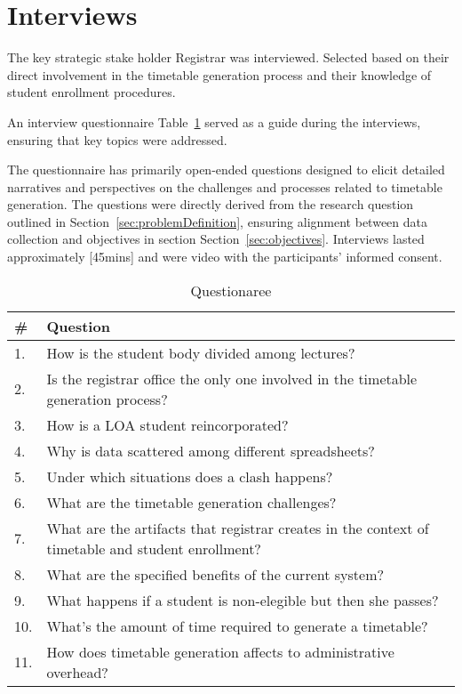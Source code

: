 \section{Interviews}
\label{sec:appendixInterviews}

The key strategic stake holder Registrar was interviewed.
Selected based on their direct involvement in the timetable generation process and their knowledge of student enrollment procedures.

An interview questionnaire Table~\ref{tab:questionaree} served as a guide during the interviews, ensuring that key topics were addressed.

The questionnaire has primarily open-ended questions designed to elicit detailed narratives and perspectives on the challenges and processes related to timetable generation.
The questions were directly derived from the research question outlined in Section~\ref{sec:problemDefinition}, ensuring alignment between data collection and objectives in section Section~\ref{sec:objectives}.
Interviews lasted approximately [45mins] and were video with the participants' informed consent.

\begin{table}[h]
    \caption{Questionaree}\label{tab:questionaree}
    \begin{tabularx}{\textwidth}{lX}
        \toprule
        \textbf{\#} &  \textbf{Question}\\
        \midrule
        1. & How is the student body divided among lectures? \\
        2. & Is the registrar office the only one involved in the timetable generation process?\\
        3. & How is a LOA student reincorporated?\\
        4. & Why is data scattered among different spreadsheets?\\
        5. & Under which situations does a clash happens?\\
        6. & What are the timetable generation challenges?\\
        7. & What are the artifacts that registrar creates in the context of timetable and student enrollment?\\
        8. & What are the specified benefits of the current system?\\
        9. & What happens if a student is non-elegible but then she passes?\\
        10. & What's the amount of time required to generate a timetable?\\
        11. & How does timetable generation affects to administrative overhead?\\
        \bottomrule
    \end{tabularx}
\end{table}

